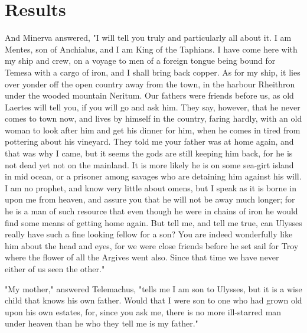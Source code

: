 \section{Results}

And Minerva answered, "I will tell you truly and particularly all about it. I
am Mentes, son of Anchialus, and I am King of the Taphians. I have come here
with my ship and crew, on a voyage to men of a foreign tongue being bound for
Temesa with a cargo of iron, and I shall bring back copper. As for my ship, it
lies over yonder off the open country away from the town, in the harbour
Rheithron under the wooded mountain Neritum. Our fathers were friends before
us, as old Laertes will tell you, if you will go and ask him. They say,
however, that he never comes to town now, and lives by himself in the country,
faring hardly, with an old woman to look after him and get his dinner for him,
when he comes in tired from pottering about his vineyard. They told me your
father was at home again, and that was why I came, but it seems the gods are
still keeping him back, for he is not dead yet not on the mainland. It is more
likely he is on some sea-girt island in mid ocean, or a prisoner among savages
who are detaining him against his will. I am no prophet, and know very little
about omens, but I speak as it is borne in upon me from heaven, and assure you
that he will not be away much longer; for he is a man of such resource that
even though he were in chains of iron he would find some means of getting home
again. But tell me, and tell me true, can Ulysses really have such a fine
looking fellow for a son? You are indeed wonderfully like him about the head
and eyes, for we were close friends before he set sail for Troy where the
flower of all the Argives went also. Since that time we have never either of
us seen the other."

"My mother," answered Telemachus, "tells me I am son to Ulysses, but it is a
wise child that knows his own father. Would that I were son to one who had
grown old upon his own estates, for, since you ask me, there is no more
ill-starred man under heaven than he who they tell me is my father."
